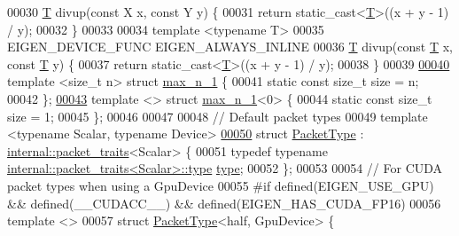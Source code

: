 \begin{DoxyCode}
00030 \hyperlink{group___sparse_core___module}{T} divup(\textcolor{keyword}{const} X x, \textcolor{keyword}{const} Y y) \{
00031   \textcolor{keywordflow}{return} \textcolor{keyword}{static\_cast<}\hyperlink{group___sparse_core___module}{T}\textcolor{keyword}{>}((x + y - 1) / y);
00032 \}
00033 
00034 \textcolor{keyword}{template} <\textcolor{keyword}{typename} T>
00035 EIGEN\_DEVICE\_FUNC EIGEN\_ALWAYS\_INLINE
00036 \hyperlink{group___sparse_core___module}{T} divup(\textcolor{keyword}{const} \hyperlink{group___sparse_core___module}{T} x, \textcolor{keyword}{const} \hyperlink{group___sparse_core___module}{T} y) \{
00037   \textcolor{keywordflow}{return} \textcolor{keyword}{static\_cast<}\hyperlink{group___sparse_core___module}{T}\textcolor{keyword}{>}((x + y - 1) / y);
00038 \}
00039 
\hyperlink{struct_eigen_1_1max__n__1}{00040} \textcolor{keyword}{template} <\textcolor{keywordtype}{size\_t} n> \textcolor{keyword}{struct }\hyperlink{struct_eigen_1_1max__n__1}{max\_n\_1} \{
00041   \textcolor{keyword}{static} \textcolor{keyword}{const} \textcolor{keywordtype}{size\_t} size = n;
00042 \};
\hyperlink{struct_eigen_1_1max__n__1_3_010_01_4}{00043} \textcolor{keyword}{template} <> \textcolor{keyword}{struct }\hyperlink{struct_eigen_1_1max__n__1}{max\_n\_1}<0> \{
00044   \textcolor{keyword}{static} \textcolor{keyword}{const} \textcolor{keywordtype}{size\_t} size = 1;
00045 \};
00046 
00047 
00048 \textcolor{comment}{// Default packet types}
00049 \textcolor{keyword}{template} <\textcolor{keyword}{typename} Scalar, \textcolor{keyword}{typename} Device>
\hyperlink{struct_eigen_1_1_packet_type}{00050} \textcolor{keyword}{struct }\hyperlink{struct_eigen_1_1_packet_type}{PacketType} : \hyperlink{struct_eigen_1_1internal_1_1packet__traits}{internal::packet\_traits}<Scalar> \{
00051   \textcolor{keyword}{typedef} \textcolor{keyword}{typename} \hyperlink{group___sparse_core___module}{internal::packet\_traits<Scalar>::type} 
      \hyperlink{group___sparse_core___module}{type};
00052 \};
00053 
00054 \textcolor{comment}{// For CUDA packet types when using a GpuDevice}
00055 \textcolor{preprocessor}{#if defined(EIGEN\_USE\_GPU) && defined(\_\_CUDACC\_\_) && defined(EIGEN\_HAS\_CUDA\_FP16)}
00056 \textcolor{keyword}{template} <>
00057 \textcolor{keyword}{struct }\hyperlink{struct_eigen_1_1_packet_type}{PacketType}<half, GpuDevice> \{

\end{DoxyCode}
